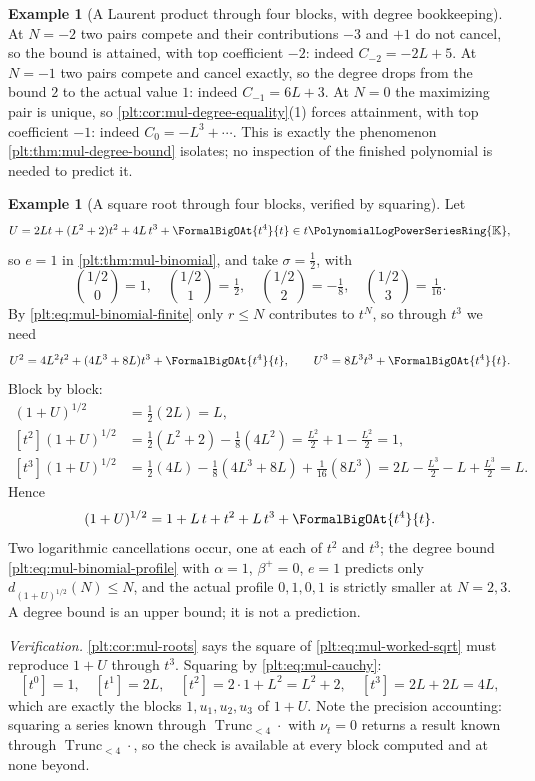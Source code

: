 \documentclass[11pt,oneside]{article}
\theoremstyle{plain}
\theoremstyle{definition}
\newtheorem{example}[theorem]{Example}
\theoremstyle{remark}
\newcommand{\K}{\mathbb{K}}
\newcommand{\PLpow}{\PolynomialLogPowerSeriesRing{\K}}   %
\newcommand{\ordt}{\nu_{t}}                              %
\newcommand{\Trunc}[2]{\operatorname{Trunc}_{<#2}#1}     %
\newcommand{\dprofile}[1]{d_{#1}}                        %
\begin{document}
\begin{example}[A Laurent product through four blocks, with degree
bookkeeping]
At $N=-2$ two pairs compete and their contributions $-3$ and $+1$ do not
cancel, so the bound is attained, with top coefficient $-2$: indeed
$C_{-2}=-2L+5$.  At $N=-1$ two pairs compete and cancel exactly, so the
degree drops from the bound $2$ to the actual value $1$: indeed
$C_{-1}=6L+3$.  At $N=0$ the maximizing pair is unique, so
\cref{plt:cor:mul-degree-equality}(1) forces attainment, with top
coefficient $-1$: indeed $C_0=-L^3+\cdots$.  This is exactly the phenomenon
\cref{plt:thm:mul-degree-bound} isolates; no inspection of the finished
polynomial is needed to predict it.
\end{example}

\begin{example}[A square root through four blocks, verified by squaring]
\label{plt:ex:mul-worked-sqrt}
Let
\[
 U=2Lt+(L^2+2)t^2+4L\,t^3+\FormalBigOAt{t^{4}}{t}\in t\PLpow,
\]
so $e=1$ in \cref{plt:thm:mul-binomial}, and take $\sigma=\tfrac12$, with
\[
 \binom{1/2}{0}=1,\quad
 \binom{1/2}{1}=\tfrac12,\quad
 \binom{1/2}{2}=-\tfrac18,\quad
 \binom{1/2}{3}=\tfrac1{16}.
\]
By \eqref{plt:eq:mul-binomial-finite} only $r\le N$ contributes to $t^N$, so
through $t^3$ we need
\[
 U^2=4L^2t^2+(4L^3+8L)t^3+\FormalBigOAt{t^{4}}{t},
 \qquad
 U^3=8L^3t^3+\FormalBigOAt{t^{4}}{t}.
\]
Block by block:
\begin{align*}
 [t^1](1+U)^{1/2}&=\tfrac12(2L)=L,\\
 [t^2](1+U)^{1/2}&=\tfrac12(L^2+2)-\tfrac18(4L^2)
   =\tfrac{L^2}2+1-\tfrac{L^2}2=1,\\
 [t^3](1+U)^{1/2}&=\tfrac12(4L)-\tfrac18(4L^3+8L)+\tfrac1{16}(8L^3)
   =2L-\tfrac{L^3}2-L+\tfrac{L^3}2=L .
\end{align*}
Hence
\begin{equation}\label{plt:eq:mul-worked-sqrt}
 (1+U)^{1/2}=1+L\,t+t^2+L\,t^3+\FormalBigOAt{t^{4}}{t}.
\end{equation}
Two logarithmic cancellations occur, one at each of $t^2$ and $t^3$; the
degree bound \eqref{plt:eq:mul-binomial-profile} with $\alpha=1$,
$\beta^{+}=0$, $e=1$ predicts only $\dprofile{(1+U)^{1/2}}(N)\le N$, and the
actual
profile $0,1,0,1$ is strictly smaller at $N=2,3$.  A degree bound is an upper
bound; it is not a prediction.

\emph{Verification.}  \cref{plt:cor:mul-roots} says the square of
\eqref{plt:eq:mul-worked-sqrt} must reproduce $1+U$ through $t^3$.  Squaring
by \eqref{plt:eq:mul-cauchy}:
\[
 [t^0]=1,\quad
 [t^1]=2L,\quad
 [t^2]=2\cdot1+L^2=L^2+2,\quad
 [t^3]=2L+2L=4L,
\]
which are exactly the blocks $1,u_1,u_2,u_3$ of $1+U$.  Note the precision
accounting: squaring a series known through $\Trunc{\cdot}{4}$ with
$\ordt=0$ returns a result known through $\Trunc{\cdot}{4}$, so the check is
available at every block computed and at none beyond.
\end{example}
\end{document}
